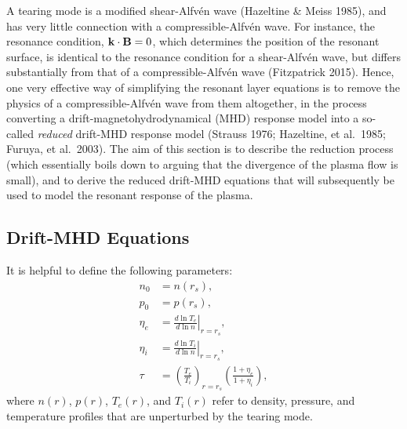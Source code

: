 \documentclass[notitlepage,12pt]{article}
\begin{document}
A tearing mode is a modified shear-Alfv\'{e}n wave (Hazeltine \& Meiss 1985), and has very little connection with a compressible-Alfv\'{e}n wave. For instance, the resonance condition, ${\bf k}\cdot{\bf B}=0$, which determines the position of the resonant
surface, is identical to the resonance condition for a  shear-Alfv\'{e}n wave, but differs substantially from that of a  compressible-Alfv\'{e}n wave (Fitzpatrick 2015). Hence, one very effective way of simplifying the resonant layer equations is to remove the
physics of a compressible-Alfv\'{e}n wave from them altogether, in the process converting a drift-magnetohydrodynamical (MHD) response model
into a so-called {\em reduced}\/ drift-MHD response model (Strauss 1976; Hazeltine, et al.\ 1985; Furuya, et al.\ 2003). The aim of
this section is to describe the reduction process (which essentially boils down to arguing that the divergence of the
plasma flow is small), and to derive the reduced drift-MHD equations that will subsequently be used to model the resonant
response of the plasma. 

\subsection{Drift-MHD Equations}
 It is helpful to define
the following parameters:
\begin{align}
n_0 &= n(r_s),\\[0.5ex]
p_0&= p(r_s),\label{e210}\\[0.5ex]
\eta_e &=\left.\frac{d\ln T_e}{d\ln n}\right|_{r=r_s},\label{e211}\\[0.5ex]
\eta_i &= \left.\frac{d\ln T_i}{d\ln n}\right|_{r=r_s},\\[0.5ex]
\tau &= \left(\frac{T_e}{T_i}\right)_{r=r_s}\left(\frac{1+\eta_e}{1+\eta_i}\right),\label{e213}
\end{align}
where $n(r)$, $p(r)$, $T_e(r)$, and $T_i(r)$ refer to density, pressure, and temperature profiles that are unperturbed by the tearing mode. 
\end{document}
